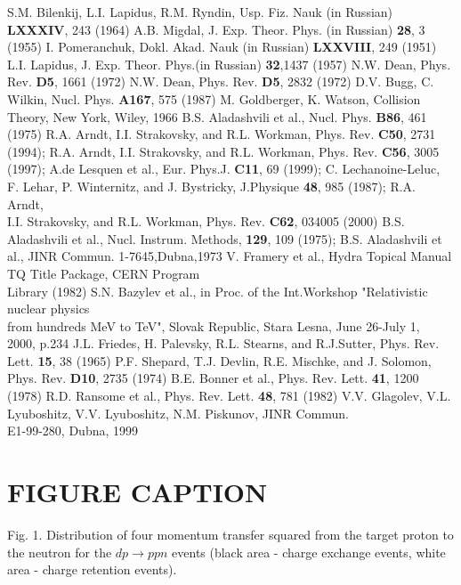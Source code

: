 \begin{thebibliography}{99}
 S.M. Bilenkij, L.I. Lapidus, R.M. Ryndin,
 Usp. Fiz. Nauk (in Russian)\\{\bf LXXXIV}, 243 (1964)
 A.B. Migdal, J. Exp. Theor. Phys. (in Russian) {\bf 28}, 3 (1955)
 I. Pomeranchuk, Dokl. Akad. Nauk (in Russian)  {\bf LXXVIII}, 249 (1951)
 L.I. Lapidus, J. Exp. Theor. Phys.(in Russian) {\bf 32},1437 (1957)
 N.W. Dean, Phys. Rev. {\bf D5}, 1661 (1972)
 N.W. Dean, Phys. Rev. {\bf D5}, 2832 (1972)
 D.V. Bugg, C. Wilkin, Nucl. Phys. {\bf A167}, 575 (1987)
 M. Goldberger, K. Watson, Collision Theory, New York,
Wiley, 1966
 B.S. Aladashvili et al., Nucl. Phys. {\bf B86}, 461 (1975)
 R.A. Arndt, I.I. Strakovsky, and R.L. Workman,
Phys. Rev. {\bf C50}, 2731\\ (1994);
 R.A. Arndt, I.I. Strakovsky, and R.L. Workman, Phys. Rev. {\bf C56}, 3005\\
 (1997);
 A.de Lesquen et al.,
Eur. Phys.J. {\bf C11}, 69 (1999); C. Lechanoine-Leluc,\\ F. Lehar, P. Winternitz,
and J. Bystricky, J.Physique {\bf 48},
 985 (1987); R.A. Arndt,\\ I.I. Strakovsky, and R.L. Workman, Phys. Rev.
 {\bf C62}, 034005 (2000)
 B.S. Aladashvili et al., Nucl. Instrum. Methods, {\bf 129},
109 (1975); B.S. Aladashvili et al., JINR Commun. 1-7645,Dubna,1973
 V. Framery et al., Hydra Topical Manual TQ Title Package,
CERN Program\\ Library (1982)
 S.N. Bazylev et al., in Proc. of the Int.Workshop
"Relativistic nuclear physics\\ from hundreds MeV to TeV", Slovak Republic,
Stara Lesna, June 26-July 1, \\2000, p.234
 J.L. Friedes, H. Palevsky, R.L. Stearns, and R.J.Sutter,
 Phys. Rev. Lett. {\bf 15}, 38 (1965)
 P.F. Shepard, T.J. Devlin, R.E. Mischke, and J. Solomon,
 Phys. Rev. {\bf D10}, 2735 (1974)
 B.E. Bonner et al., Phys. Rev. Lett. {\bf 41}, 1200 (1978)
 R.D. Ransome et al., Phys. Rev. Lett. {\bf 48}, 781 (1982)
 V.V. Glagolev, V.L. Lyuboshitz, V.V. Lyuboshitz, N.M. Piskunov,
JINR Commun.\\ E1-99-280, Dubna, 1999
\end{thebibliography}
\newpage
\section{FIGURE CAPTION}
\noindent
Fig. 1. Distribution of four momentum transfer squared from the target proton
 to the neutron for the $dp\to ppn$ events (black
area - charge exchange events, white area - charge retention events). \\

